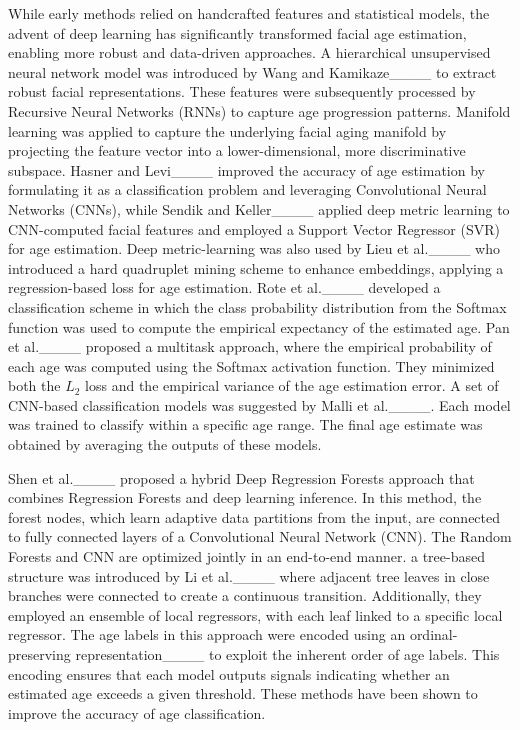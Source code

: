 While early methods relied on handcrafted features and statistical models, the
advent of deep learning has significantly transformed facial age estimation,
enabling more robust and data-driven approaches. A hierarchical unsupervised
neural network model was introduced by Wang and Kamikaze____ to
extract robust facial representations. These features were subsequently
processed by Recursive Neural Networks (RNNs) to capture age progression
patterns. Manifold learning was applied to capture the underlying facial aging
manifold by projecting the feature vector into a lower-dimensional, more
discriminative subspace. Hasner and Levi____ improved the accuracy
of age estimation by formulating it as a classification problem and leveraging
Convolutional Neural Networks (CNNs), while Sendik and Keller____
applied deep metric learning to CNN-computed facial features and employed a
Support Vector Regressor (SVR) for age estimation. Deep metric-learning was
also used by Lieu et al.____ who introduced a hard quadruplet
mining scheme to enhance embeddings, applying a regression-based loss for age
estimation. Rote et al.____ developed a classification scheme in
which the class probability distribution from the Softmax function was used to
compute the empirical expectancy of the estimated age. Pan et
al.____ proposed a multitask approach, where the empirical
probability of each age was computed using the Softmax activation function.
They minimized both the $L_{2}$ loss and the empirical variance of the age
estimation error. A set of CNN-based classification models was suggested by
Malli et al.____. Each model was trained to classify within a
specific age range. The final age estimate was obtained by averaging the
outputs of these models.

Shen et al.____ proposed a hybrid Deep Regression Forests approach
that combines Regression Forests and deep learning inference. In this method,
the forest nodes, which learn adaptive data partitions from the input, are
connected to fully connected layers of a Convolutional Neural Network (CNN).
The Random Forests and CNN are optimized jointly in an end-to-end manner. a
tree-based structure was introduced by Li et al.____ where adjacent
tree leaves in close branches were connected to create a continuous
transition. Additionally, they employed an ensemble of local regressors, with
each leaf linked to a specific local regressor. The age labels in this
approach were encoded using an ordinal-preserving
representation____ to exploit the inherent
order of age labels. This encoding ensures that each model outputs signals
indicating whether an estimated age exceeds a given threshold. These methods
have been shown to improve the accuracy of age classification.

